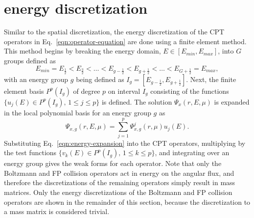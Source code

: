 \section{\dG energy discretization}
Similar to the spatial discretization, the energy discretization of the CPT operators in Eq.~\eqref{eqn:operator-equation} are done using a \dG finite element method. This method begins by breaking the energy domain, $E \in [E_{min}, E_{max}]$, into $G$ groups defined as
\begin{equation}
    E_{min} = E_{\frac{1}{2}} < E_{\frac{3}{2}} < \ldots < E_{g-\frac{1}{2}} < E_{g+\frac{1}{2}} < \ldots < E_{G+\frac{1}{2}} = E_{max},
\end{equation}
with an energy group $g$ being defined as $I_g = [E_{g-\frac{1}{2}}, E_{g+\frac{1}{2}}]$. Next, the finite element basis $P^p(I_g)$ of degree $p$ on interval $I_g$ consisting of the functions $\lbrace u_j(E) \in P^p(I_g), \, 1 \leq j \leq p \rbrace$ is defined. The solution $\Psi_x(r,E,\mu)$ is expanded in the local polynomial basis for an energy group $g$ as
\begin{equation} \label{eqn:energy-expansion}
    \Psi_{x,g}(r,E,\mu) = \sum_{j=1}^p \Psi_{x,g}^j(r,\mu) u_j(E).
\end{equation}
Substituting Eq.~\eqref{eqn:energy-expansion} into the CPT operators, multiplying by the test functions $\lbrace v_k(E) \in P^p(I_g), \, 1 \leq k \leq p \rbrace$, and integrating over an energy group gives the weak forms for each operator. Note that only the Boltzmann and FP collision operators act in energy on the angular flux, and therefore the \dG discretizations of the remaining operators simply result in mass matrices. Only the \dG energy discretizations of the Boltzmann and FP collision operators are shown in the remainder of this section, because the discretization to a mass matrix is considered trivial.

